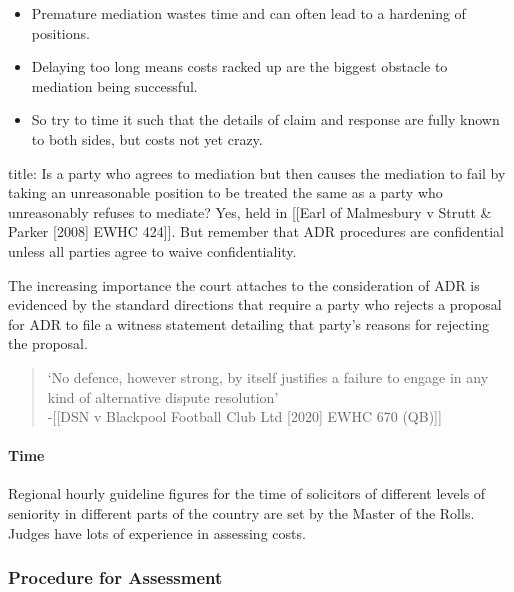 \documentclass[
]{article}
\newenvironment{Shaded}{}{}
\newcommand{\NormalTok}[1]{#1}
\providecommand{\tightlist}{%
  \setlength{\itemsep}{0pt}\setlength{\parskip}{0pt}}
\begin{document}
\begin{itemize}
\tightlist
\item
  Premature mediation wastes time and can often lead to a hardening of
  positions.
\item
  Delaying too long means costs racked up are the biggest obstacle to
  mediation being successful.
\item
  So try to time it such that the details of claim and response are
  fully known to both sides, but costs not yet crazy.
\end{itemize}

\begin{Shaded}
\begin{Highlighting}[]
\NormalTok{title: Is a party who agrees to mediation but then causes the mediation to fail by taking an unreasonable position to be treated the same as a party who unreasonably refuses to mediate?}
\NormalTok{Yes, held in [[Earl of Malmesbury v Strutt \& Parker [2008] EWHC 424]]. But remember that ADR procedures are confidential unless all parties agree to waive confidentiality.}
\end{Highlighting}
\end{Shaded}

The increasing importance the court attaches to the consideration of ADR
is evidenced by the standard directions that require a party who rejects
a proposal for ADR to file a witness statement detailing that party's
reasons for rejecting the proposal.

\begin{quote}
`No defence, however strong, by itself justifies a failure to engage in
any kind of alternative dispute resolution'\\
-{[}{[}DSN v Blackpool Football Club Ltd {[}2020{]} EWHC 670 (QB){]}{]}
\end{quote}

\hypertarget{time}{%
\paragraph{Time}\label{time}}

Regional hourly guideline figures for the time of solicitors of
different levels of seniority in different parts of the country are set
by the Master of the Rolls. Judges have lots of experience in assessing
costs.

\hypertarget{procedure-for-assessment}{%
\subsubsection{Procedure for
Assessment}\label{procedure-for-assessment}}
\end{document}
